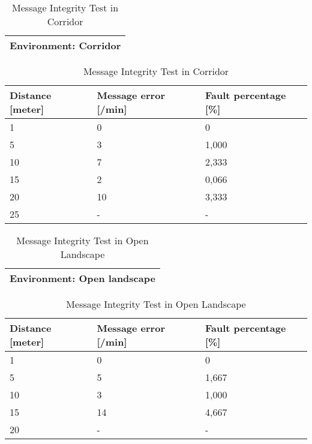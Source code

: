 \begin{table}[ht]
\begin{center}
 \begin{tabular}{|l|} 
 \hline
 Environment: \textbf{Corridor}\\
 \hline
 \end{tabular}
 \begin{tabular}{|l|l|l|}
 \hline
 Distance [meter] & Message error [/min] &  Fault percentage [\%]\\
 \hline
 1		        &   0 		&	0    \\
 5              &   3  		&	1,000\\
 10             &   7  		&	2,333\\
 15				&	2 		&	0,066\\
 20				&	10 		&	3,333\\
 25				&	-		&	-    \\
 \hline
\end{tabular}
\end{center}
\caption{Message Integrity Test in Corridor}
\label{tab:messintegritycorr}
\end{table}

\begin{table}[ht]
\begin{center}
 \begin{tabular}{|l|} 
 \hline
 Environment: \textbf{Open landscape}\\
 \hline
 \end{tabular}
 \begin{tabular}{|l|l|l|}
 \hline
 Distance [meter] & Message error [/min] &  Fault percentage [\%]\\
 \hline
 1		        &   0 		&	0    \\
 5              &   5  		&	1,667\\
 10             &   3  		&	1,000\\
 15				&	14 		&	4,667\\
 20				&	-  		&	-	\\
 \hline
\end{tabular}
\end{center}
\caption{Message Integrity Test in Open Landscape}
\label{tab:messintegrityopen}
\end{table}